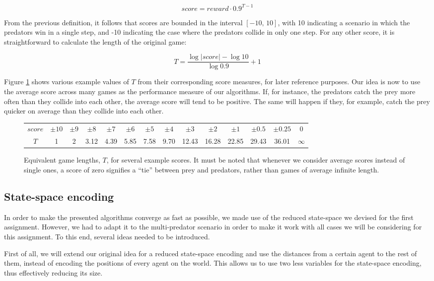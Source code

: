 \documentclass[a4paper,12pt]{article}
\begin{document}
$$ score = reward \cdot 0.9^{T - 1} $$

From the previous definition, it follows that scores are bounded in the interval $[-10,\,10]$, with 10 indicating a scenario in which the predators win in a single step, and -10 indicating the case where the predators collide in only one step. For any other score, it is straightforward to calculate the length of the original game:

$$ T = \frac{\log | score | - \log 10}{\log 0.9} + 1$$

Figure \ref{fig:scores} shows various example values of $T$ from their corresponding score measures, for later reference purposes. Our idea is now to use the average score across many games as the performance measure of our algorithms. If, for instance, the predators catch the prey more often than they collide into each other, the average score will tend to be positive. The same will happen if they, for example, catch the prey quicker on average than they collide into each other.

\begin{figure}[ht!]
\centering
 \begin{tabular}{c|ccccccccccccc}
  $score$ & $\pm10$ & $\pm9$ & $\pm8$ & $\pm7$ & $\pm6$ & $\pm5$ & $\pm4$ & $\pm3$& $\pm2$ & $\pm1$ & $\pm0.5$ & $\pm0.25$ & $0$ \\
  $T$ & 1 & 2 & 3.12 & 4.39 & 5.85 & 7.58 & 9.70 & 12.43 & 16.28 & 22.85 & 29.43 & 36.01 & $\infty$ \\
 \end{tabular}
\caption{Equivalent game lengths, $T$, for several example scores. It must be noted that whenever we consider average scores instead of single ones, a score of zero signifies a ``tie'' between prey and predators, rather than games of average infinite length.}
\label{fig:scores}
\end{figure}


\subsection{State-space encoding}

In order to make the presented algorithms converge as fast as possible, we made use of the reduced state-space we devised for the first assignment. However, we had to adapt it to the multi-predator scenario in order to make it work with all cases we will be considering for this assignment. To this end, several ideas needed to be introduced.

First of all, we will extend our original idea for a reduced state-space encoding and use the distances from a certain agent to the rest of them, instead of encoding the positions of every agent on the world. This allows us to use two less variables for the state-space encoding, thus effectively reducing its size. 
\end{document}
